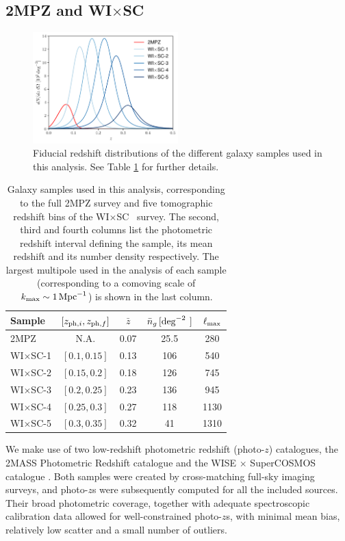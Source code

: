 \documentclass[useAMS,usenatbib]{mn2e}
\newcommand{\wisc}{WI$\times$SC}
\begin{document}
  \subsection{2MPZ and \wisc}\label{ssec:data.g1}
    \begin{figure}
      \centering
      \includegraphics[width=0.5\textwidth]{nzs.pdf}
      \caption{Fiducial redshift distributions of the different galaxy samples used in this analysis. See Table \ref{tab:z_bins} for further details.}
      \label{fig:dndz}
    \end{figure}
    \begin{table}
      \begin{center}
        \begin{tabular}{l|cccc}
          \hline
          Sample & $[z_{{\rm ph},i},z_{{\rm ph},f}]$ & $\bar{z}$ & $\bar{n}_g\,[{\rm deg}^{-2^{\phantom{2}}}]$ & $\ell_{\rm max}$\\[1ex]
          \hline
          2MPZ    & N.A.         & 0.07 &  25.5 &  280 \\
          \wisc-1 & $[0.1,0.15]$ & 0.13 & 106   &  540 \\
          \wisc-2 & $[0.15,0.2]$ & 0.18 & 126   &  745 \\
          \wisc-3 & $[0.2,0.25]$ & 0.23 & 136   &  945 \\
          \wisc-4 & $[0.25,0.3]$ & 0.27 & 118   & 1130 \\
          \wisc-5 & $[0.3,0.35]$ & 0.32 & 41    & 1310 \\
          \hline
        \end{tabular}
        \caption{Galaxy samples used in this analysis, corresponding to the full 2MPZ survey and five tomographic redshift bins of the \wisc~ survey. The second, third and fourth columns list the photometric redshift interval defining the sample, its mean redshift and its number density respectively. The largest multipole used in the analysis of each sample (corresponding to a comoving scale of $k_{\rm max}\sim 1\,{\rm Mpc}^{-1}$) is shown in the last column.}\label{tab:z_bins}
      \end{center}
    \end{table} 
    We make use of two low-redshift photometric redshift (photo-$z$) catalogues, the 2MASS Photometric Redshift catalogue \citep[2MPZ,][]{2014ApJS..210....9B} and the WISE $\times$ SuperCOSMOS catalogue \citep[\wisc,][]{2016ApJS..225....5B}. Both samples were created by cross-matching full-sky imaging surveys, and photo-$z$s were subsequently computed for all the included sources. Their broad photometric coverage, together with adequate spectroscopic calibration data allowed for well-constrained photo-$z$s, with minimal mean bias, relatively low scatter and a small number of outliers.
    
\end{document}
